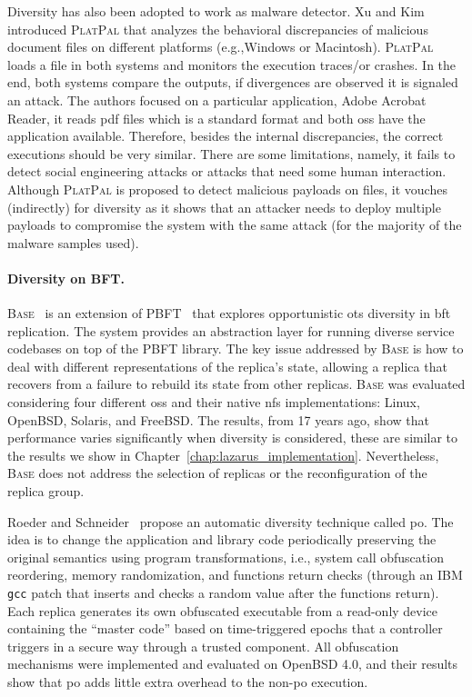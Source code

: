 Diversity has also been adopted to work as malware detector. 
Xu and Kim~\cite{Xu:2017} introduced \textsc{PlatPal} that analyzes the behavioral discrepancies of malicious document files on different platforms (e.g.,Windows or Macintosh). 
\textsc{PlatPal} loads a file in both systems and monitors the execution traces/or crashes. 
In the end, both systems compare the outputs, if divergences are observed it is signaled an attack.
The authors focused on a particular application, Adobe Acrobat Reader, it reads pdf files which is a standard format and both \glspl{os} have the application available.
Therefore, besides the internal discrepancies, the correct executions should be very similar.
There are some limitations, namely, it fails to detect social engineering attacks or attacks that need some human interaction.
Although \textsc{PlatPal} is proposed to detect malicious payloads on files, it vouches (indirectly) for diversity as it shows that an attacker needs to deploy multiple payloads to compromise the system with the same attack (for the majority of the malware samples used).

\paragraph{Diversity on BFT.}
\textsc{Base}~\cite{Rodrigues:2001} is an extension of PBFT~\cite{Castro:1999} that explores opportunistic \gls{ots} diversity in \gls{bft} replication. 
The system provides an abstraction layer for running diverse service codebases on top of the PBFT library.
The key issue addressed by \textsc{Base} is how to deal with different representations of the replica's state, allowing a replica that recovers from a failure to rebuild its state from other replicas. 
\textsc{Base} was evaluated considering four different \glspl{os} and their native \gls{nfs} implementations: Linux, OpenBSD, Solaris, and FreeBSD.
The results, from 17 years ago, show that performance varies significantly when diversity is considered, these are similar to the results we show in Chapter~\ref{chap:lazarus_implementation}.
Nevertheless, \textsc{Base} does not address the selection of replicas or the reconfiguration of the replica group.

Roeder and Schneider~\cite{Roeder:2010} propose an automatic diversity technique called \gls{po}.
The idea is to change the application and library code periodically preserving the original semantics using program transformations, i.e., system call obfuscation reordering, memory randomization, and functions return checks (through an IBM \texttt{gcc} patch that inserts and checks a random value after the functions return).
Each replica generates its own obfuscated executable from a read-only device containing the ``master code'' based on time-triggered epochs that a controller triggers in a secure way through a trusted component.
All obfuscation mechanisms were implemented and evaluated on OpenBSD 4.0, and their results show that \gls{po} adds little extra overhead to the non-\gls{po} execution.

